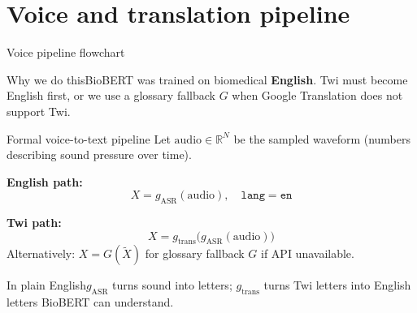 \documentclass[aspectratio=169,11pt]{beamer}
\newcommand{\why}[1]{\begin{block}{Why we do this}\small #1\end{block}}
\newcommand{\plain}[1]{\begin{block}{In plain English}\small #1\end{block}}
\begin{document}
\section{Voice and translation pipeline}

\begin{frame}{Voice pipeline flowchart}
	\begin{center}
	\end{center}

	\why{BioBERT was trained on biomedical \textbf{English}. Twi must become English first, or we use a glossary fallback $G$ when Google Translation does not support Twi.}
\end{frame}

\begin{frame}{Formal voice-to-text pipeline}
	Let $\mathrm{audio} \in \mathbb{R}^{N}$ be the sampled waveform (numbers describing sound pressure over time).

	\textbf{English path:}
	\[
	X = g_{\text{ASR}}(\mathrm{audio}), \quad \texttt{lang} = \texttt{en}
	\]

	\textbf{Twi path:}
	\[
	X = g_{\text{trans}}\!\bigl(g_{\text{ASR}}(\mathrm{audio})\bigr)
	\]
	Alternatively: $X = G(\tilde{X})$ for glossary fallback $G$ if API unavailable.

	\plain{$g_{\text{ASR}}$ turns sound into letters; $g_{\text{trans}}$ turns Twi letters into English letters BioBERT can understand.}
\end{frame}
\end{document}
